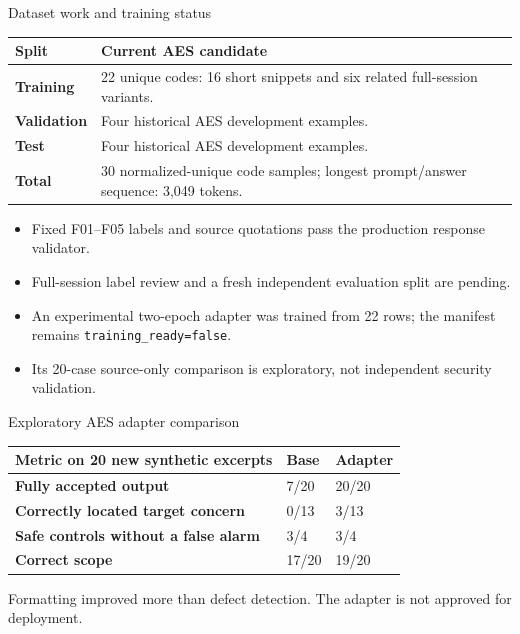 \documentclass[aspectratio=169,10pt]{beamer}
\begin{document}
\begin{frame}{Dataset work and training status}
\small
\begin{tabularx}{\textwidth}{>{\bfseries}p{3.6cm}X}
\toprule
Split & Current AES candidate \\
\midrule
Training & 22 unique codes: 16 short snippets and six related full-session variants. \\
Validation & Four historical AES development examples. \\
Test & Four historical AES development examples. \\
Total & 30 normalized-unique code samples; longest prompt/answer sequence: 3,049 tokens. \\
\bottomrule
\end{tabularx}
\vspace{0.7em}
\begin{itemize}
\item Fixed F01--F05 labels and source quotations pass the production response validator.
\item Full-session label review and a fresh independent evaluation split are pending.
\item An experimental two-epoch adapter was trained from 22 rows; the manifest remains \texttt{training\_ready=false}.
\item Its 20-case source-only comparison is exploratory, not independent security validation.
\end{itemize}
\end{frame}

\begin{frame}{Exploratory AES adapter comparison}
\small
\begin{tabularx}{\textwidth}{>{\bfseries}p{5.0cm}XX}
\toprule
Metric on 20 new synthetic excerpts & Base & Adapter \\
\midrule
Fully accepted output & 7/20 & 20/20 \\
Correctly located target concern & 0/13 & 3/13 \\
Safe controls without a false alarm & 3/4 & 3/4 \\
Correct scope & 17/20 & 19/20 \\
\bottomrule
\end{tabularx}
\vspace{0.7em}
\alert{Formatting improved more than defect detection. The adapter is not approved for deployment.}
\end{frame}
\end{document}

